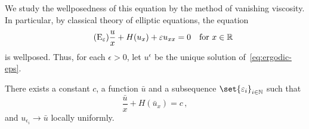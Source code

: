 \documentclass[12pt]{article}
\begin{document}
We study the wellposedness of  this equation by the method of vanishing viscosity. 
In particular, by classical theory of elliptic equations, the equation 
\begin{equation} \label{eq:ergodic-eps}
    \tag{E$_\epsilon$}
    \frac{u}{x} + H(u_x) + \epsilon u_{xx} = 0 \quad \text{for } x \in \R 
\end{equation}
is wellposed. Thus, for each $\epsilon >0$, let $u^\epsilon$ be the unique solution of~\eqref{eq:ergodic-eps}.
\begin{lemma}
    There exists a constant $c$, a function $\bar u$ and a subsequence $\set{\epsilon_i}_{i\in \N}$ such that 
    \begin{equation}
        \frac{\bar u}{x} + H(\bar u_x) = c \,,
    \end{equation}
    and $u_{\epsilon_i} \to \bar u$ locally uniformly.
\end{lemma}

\printbibliography 
%
%
\end{document}
